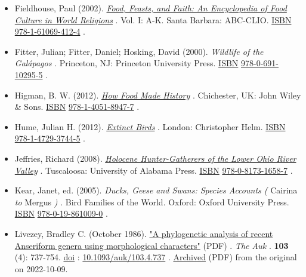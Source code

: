 \documentclass[11pt,a4paper]{article}
\begin{document}
\begin{itemize}
\item Fieldhouse, Paul (2002). \href{https://books.google.com/books?id=P-FqDgAAQBAJ\&pg=PA167}{\textit{Food, Feasts, and Faith: An Encyclopedia of Food Culture in World Religions}} . Vol. I: A-K. Santa Barbara: ABC-CLIO. \href{/wiki/ISBN\_\%28identifier\%29}{ISBN} \href{/wiki/Special:BookSources/978-1-61069-412-4}{978-1-61069-412-4} .
\item Fitter, Julian; Fitter, Daniel; Hosking, David (2000). \textit{Wildlife of the Galápagos} . Princeton, NJ: Princeton University Press. \href{/wiki/ISBN\_\%28identifier\%29}{ISBN} \href{/wiki/Special:BookSources/978-0-691-10295-5}{978-0-691-10295-5} .
\item Higman, B. W. (2012). \href{https://books.google.com/books?id=YIUoz98yMvgC\&pg=RA1-PA1801}{\textit{How Food Made History}} . Chichester, UK: John Wiley \& Sons. \href{/wiki/ISBN\_\%28identifier\%29}{ISBN} \href{/wiki/Special:BookSources/978-1-4051-8947-7}{978-1-4051-8947-7} .
\item Hume, Julian H. (2012). \href{https://books.google.com/books?id=40sxDwAAQBAJ\&pg=PA53}{\textit{Extinct Birds}} . London: Christopher Helm. \href{/wiki/ISBN\_\%28identifier\%29}{ISBN} \href{/wiki/Special:BookSources/978-1-4729-3744-5}{978-1-4729-3744-5} .
\item Jeffries, Richard (2008). \href{https://archive.org/details/holocenehunterga0000jeff/mode/2up}{\textit{Holocene Hunter-Gatherers of the Lower Ohio River Valley}} . Tuscaloosa: University of Alabama Press. \href{/wiki/ISBN\_\%28identifier\%29}{ISBN} \href{/wiki/Special:BookSources/978-0-8173-1658-7}{978-0-8173-1658-7} .
\item Kear, Janet, ed. (2005). \textit{Ducks, Geese and Swans: Species Accounts (} Cairina \textit{to} Mergus \textit{)} . Bird Families of the World. Oxford: Oxford University Press. \href{/wiki/ISBN\_\%28identifier\%29}{ISBN} \href{/wiki/Special:BookSources/978-0-19-861009-0}{978-0-19-861009-0} .
\item Livezey, Bradley C. (October 1986). \href{https://sora.unm.edu/sites/default/files/journals/auk/v103n04/p0737-p0754.pdf}{"A phylogenetic analysis of recent Anseriform genera using morphological characters"} (PDF) . \textit{The Auk} . \textbf{103} (4): 737-754. \href{/wiki/Doi\_\%28identifier\%29}{doi} : \href{https://doi.org/10.1093\%2Fauk\%2F103.4.737}{10.1093/auk/103.4.737} . \href{https://ghostarchive.org/archive/20221009/https://sora.unm.edu/sites/default/files/journals/auk/v103n04/p0737-p0754.pdf}{Archived} (PDF) from the original on 2022-10-09.

\end{itemize}
\end{document}
